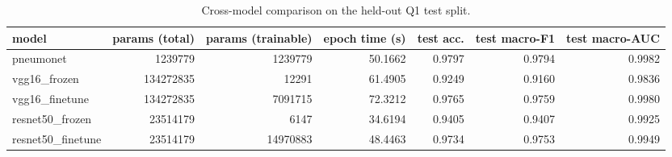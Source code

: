 \begin{table}[t]
\centering
\small
\caption{Cross-model comparison on the held-out Q1 test split.}
\label{tab:q1comparison}
\begin{tabular}{lrrrrrr}
\hline
model & params (total) & params (trainable) & epoch time (s) & test acc. & test macro-F1 & test macro-AUC \\
\hline
pneumonet & 1239779 & 1239779 & 50.1662 & 0.9797 & 0.9794 & 0.9982 \\
vgg16\_frozen & 134272835 & 12291 & 61.4905 & 0.9249 & 0.9160 & 0.9836 \\
vgg16\_finetune & 134272835 & 7091715 & 72.3212 & 0.9765 & 0.9759 & 0.9980 \\
resnet50\_frozen & 23514179 & 6147 & 34.6194 & 0.9405 & 0.9407 & 0.9925 \\
resnet50\_finetune & 23514179 & 14970883 & 48.4463 & 0.9734 & 0.9753 & 0.9949 \\
\hline
\end{tabular}
\end{table}
